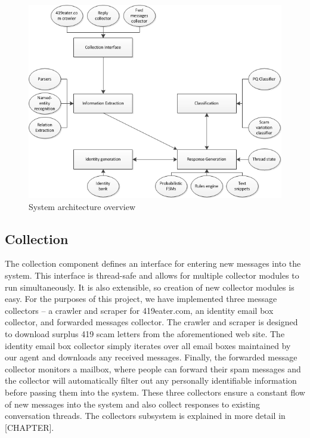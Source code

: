 \begin{figure}[h]
	\includegraphics{pics/system_smaller.png}
	\caption{System architecture overview}
\end{figure}


\subsection*{Collection}
The collection component defines an interface for entering new messages into the system. This interface is thread-safe and allows for multiple collector modules to run simultaneously. It is also extensible, so creation of new collector modules is easy. For the purposes of this project, we have implemented three message collectors -- a crawler and scraper for 419eater.com, an identity email box collector, and forwarded messages collector. The crawler and scraper is designed to download surplus 419 scam letters from the aforementioned web site. The identity email box collector simply iterates over all email boxes maintained by our agent and downloads any received messages. Finally, the forwarded message collector monitors a mailbox, where people can forward their spam messages and the collector will automatically filter out any personally identifiable information before passing them into the system. These three collectors ensure a constant flow of new messages into the system and also collect responses to existing conversation threads. The collectors subsystem is explained in more detail in [CHAPTER].

